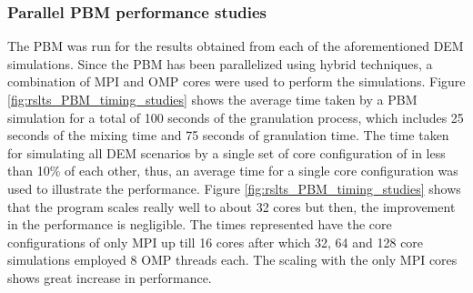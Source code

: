 \documentclass[preprint,11pt,authoryear]{elsarticle}
\begin{document}
\subsubsection{Parallel PBM performance studies}
 The PBM was run for the results obtained from each of the aforementioned DEM simulations. 
Since the PBM has been parallelized using hybrid techniques, a combination of MPI and OMP cores 
were used to perform the simulations. Figure \ref{fig:rslts_PBM_timing_studies} shows the average time 
taken by a PBM simulation for a total of 100 seconds of the granulation process, which includes 25 
seconds of the mixing time and 75 seconds of granulation time. The time taken for simulating all DEM 
scenarios by a single set of core configuration of in less than 10\% of each other, thus, an  average 
time for a single core configuration was used to illustrate the performance. Figure 
\ref{fig:rslts_PBM_timing_studies} shows that the program scales really well to about 32 cores but then, 
the improvement in the performance is negligible. The times represented have the core configurations 
of only MPI up till 16 cores after which 32, 64 and 128 core simulations employed 8 OMP threads 
each. The scaling with the only MPI cores shows great increase in performance. \\
\end{document}
